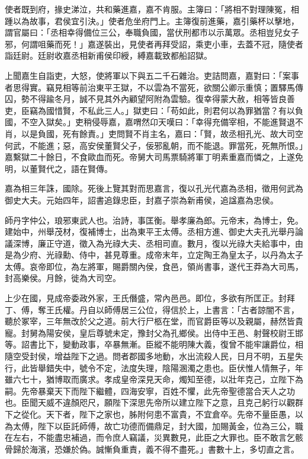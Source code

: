 \begin{pinyinscope}
使者既到府，掾史涕泣，共和藥進嘉，嘉不肯服。主簿曰：「將相不對理陳冤，相踵以為故事，君侯宜引決。」使者危坐府門上。主簿復前進藥，嘉引藥杯以擊地，謂官屬曰：「丞相幸得備位三公，奉職負國，當伏刑都市以示萬眾。丞相豈兒女子邪，何謂咀藥而死！」嘉遂裝出，見使者再拜受詔，乘吏小車，去蓋不冠，隨使者詣廷尉。廷尉收嘉丞相新甫侯印綬，縛嘉載致都船詔獄。

上聞嘉生自詣吏，大怒，使將軍以下與五二千石雜治。吏詰問嘉，嘉對曰：「案事者思得實。竊見相等前治東平王獄，不以雲為不當死，欲關公卿示重慎；置驛馬傳囚，勢不得踰冬月，誠不見其外內顧望阿附為雲驗。復幸得蒙大赦，相等皆良善吏，臣竊為國惜賢，不私此三人。」獄吏曰：「苟如此，則君何以為罪猶當？有以負國，不空入獄矣。」吏稍侵辱嘉，嘉喟然卬天嘆曰：「幸得充備宰相，不能進賢退不肖，以是負國，死有餘責。」吏問賢不肖主名，嘉曰：「賢，故丞相孔光、故大司空何武，不能進；惡，高安侯董賢父子，佞邪亂朝，而不能退。罪當死，死無所恨。」嘉繫獄二十餘日，不食歐血而死。帝舅大司馬票騎將軍丁明素重嘉而憐之，上遂免明，以董賢代之，語在賢傳。

嘉為相三年誅，國除。死後上覽其對而思嘉言，復以孔光代嘉為丞相，徵用何武為御史大夫。元始四年，詔書追錄忠臣，封嘉子崇為新甫侯，追諡嘉為忠侯。

師丹字仲公，琅邪東武人也。治詩，事匡衡。舉孝廉為郎。元帝末，為博士，免。建始中，州舉茂材，復補博士，出為東平王太傅。丞相方進、御史大夫孔光舉丹論議深博，廉正守道，徵入為光祿大夫、丞相司直。數月，復以光祿大夫給事中，由是為少府、光祿勳、侍中，甚見尊重。成帝末年，立定陶王為皇太子，以丹為太子太傅。哀帝即位，為左將軍，賜爵關內侯，食邑，領尚書事，遂代王莽為大司馬，封高樂侯。月餘，徙為大司空。

上少在國，見成帝委政外家，王氏僭盛，常內邑邑。即位，多欲有所匡正。封拜丁、傅，奪王氏權。丹自以師傅居三公位，得信於上，上書言：「古者諒闇不言，聽於冢宰，三年無改於父之道。前大行尸柩在堂，而官爵臣等以及親屬，赫然皆貴寵。封舅為陽安侯，皇后尊號未定，豫封父為孔鄉侯。出侍中王邑、射聲校尉王邯等。詔書比下，變動政事，卒暴無漸。臣縱不能明陳大義，復曾不能牢讓爵位，相隨空受封侯，增益陛下之過。問者郡國多地動，水出流殺人民，日月不明，五星失行，此皆舉錯失中，號令不定，法度失理，陰陽溷濁之患也。臣伏惟人情無子，年雖六七十，猶博取而廣求。孝成皇帝深見天命，燭知至德，以壯年克己，立陛下為嗣。先帝暴棄天下而陛下繼體，四海安寧，百姓不懼，此先帝聖德當合天人之功也。臣聞天威不違顏咫尺，願陛下深思先帝所以建立陛下之意，且克己躬行以觀群下之從化。天下者，陛下之家也，胏附何患不富貴，不宜倉卒。先帝不量臣愚，以為太傅，陛下以臣託師傅，故亡功德而備鼎足，封大國，加賜黃金，位為三公，職在左右，不能盡忠補過，而令庶人竊議，災異數見，此臣之大罪也。臣不敢言乞骸骨歸於海濱，恐嫌於偽。誠慚負重責，義不得不盡死。」書數十上，多切直之言。


\end{pinyinscope}
